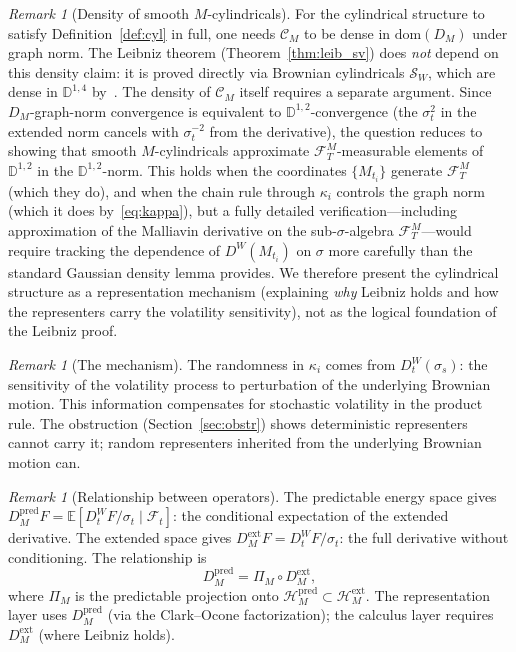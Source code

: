 \documentclass[11pt,a4paper]{article}
\theoremstyle{plain}
\theoremstyle{definition}
\theoremstyle{remark}
\newtheorem{remark}[theorem]{Remark}
\newcommand{\E}{\mathbb{E}}
\newcommand{\dom}{\mathrm{dom}}
\newcommand{\HM}{\mathcal{H}_M}
\begin{document}
\begin{remark}[Density of smooth $M$-cylindricals]\label{rem:density_cyl}
For the cylindrical structure to satisfy Definition~\ref{def:cyl} in full, one needs $\mathcal{C}_M$ to be dense in $\dom(D_M)$ under graph norm. The Leibniz theorem (Theorem~\ref{thm:leib_sv}) does \emph{not} depend on this density claim: it is proved directly via Brownian cylindricals $\mathcal{S}_W$, which are dense in $\mathbb{D}^{1,4}$ by~\cite[Lemma 1.2.1]{Nualart2006}. The density of $\mathcal{C}_M$ itself requires a separate argument. Since $D_M$-graph-norm convergence is equivalent to $\mathbb{D}^{1,2}$-convergence (the $\sigma_t^2$ in the extended norm cancels with $\sigma_t^{-2}$ from the derivative), the question reduces to showing that smooth $M$-cylindricals approximate $\mathcal{F}_T^M$-measurable elements of $\mathbb{D}^{1,2}$ in the $\mathbb{D}^{1,2}$-norm. This holds when the coordinates $\{M_{t_i}\}$ generate $\mathcal{F}_T^M$ (which they do), and when the chain rule through $\kappa_i$ controls the graph norm (which it does by~\eqref{eq:kappa}), but a fully detailed verification---including approximation of the Malliavin derivative on the sub-$\sigma$-algebra $\mathcal{F}_T^M$---would require tracking the dependence of $D^W(M_{t_i})$ on $\sigma$ more carefully than the standard Gaussian density lemma provides. We therefore present the cylindrical structure as a representation mechanism (explaining \emph{why} Leibniz holds and how the representers carry the volatility sensitivity), not as the logical foundation of the Leibniz proof.
\end{remark}

\begin{remark}[The mechanism]\label{rem:mechanism}
The randomness in $\kappa_i$ comes from $D_t^W(\sigma_s)$: the sensitivity of the volatility process to perturbation of the underlying Brownian motion. This information compensates for stochastic volatility in the product rule. The obstruction (Section~\ref{sec:obstr}) shows deterministic representers cannot carry it; random representers inherited from the underlying Brownian motion can.
\end{remark}

\begin{remark}[Relationship between operators]\label{rem:two_ops}
The predictable energy space gives $D_M^{\mathrm{pred}} F = \E[D_t^W F / \sigma_t \mid \mathcal{F}_t]$: the conditional expectation of the extended derivative. The extended space gives $D_M^{\mathrm{ext}} F = D_t^W F / \sigma_t$: the full derivative without conditioning. The relationship is
\[
D_M^{\mathrm{pred}} = \Pi_M \circ D_M^{\mathrm{ext}},
\]
where $\Pi_M$ is the predictable projection onto $\HM^{\mathrm{pred}} \subset \HM^{\mathrm{ext}}$. The representation layer uses $D_M^{\mathrm{pred}}$ (via the Clark--Ocone factorization); the calculus layer requires $D_M^{\mathrm{ext}}$ (where Leibniz holds).
\end{remark}
\end{document}
